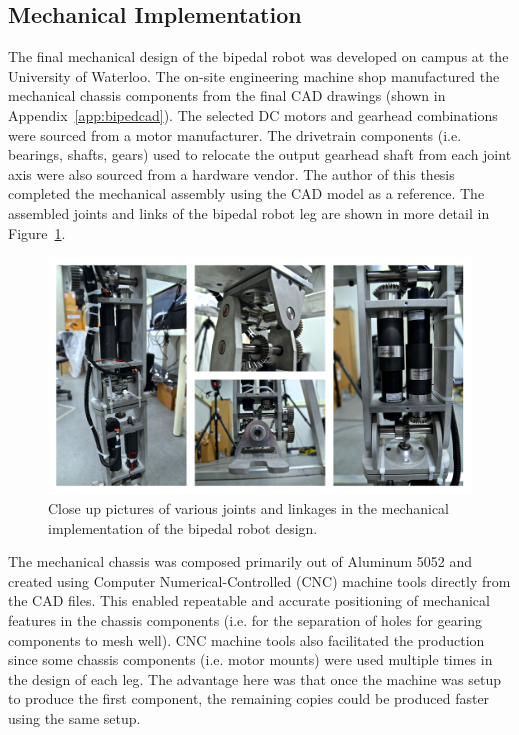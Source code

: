 \subsection{Mechanical Implementation} %
\label{sub:mechanical_implementation}

The final mechanical design of the bipedal robot was developed on campus at the University of Waterloo. The on-site engineering machine shop manufactured the mechanical chassis components from the final CAD drawings (shown in Appendix~\ref{app:bipedcad}). The selected DC motors and gearhead combinations were sourced from a motor manufacturer. The drivetrain components (i.e. bearings, shafts, gears) used to relocate the output gearhead shaft from each joint axis were also sourced from a hardware vendor. The author of this thesis completed the mechanical assembly using the CAD model as a reference. The assembled joints and links of the bipedal robot leg are shown in more detail in Figure~\ref{fig:bipedcloseup}.

\begin{figure}[!h]
	\centering
    \includegraphics[scale=0.38]{fig/hardware/bipedcloseup.png} 
  	\caption{Close up pictures of various joints and linkages in the mechanical implementation of the bipedal robot design.}
	\label{fig:bipedcloseup}
\end{figure}

The mechanical chassis was composed primarily out of Aluminum 5052 and created using Computer Numerical-Controlled (CNC) machine tools directly from the CAD files. This enabled repeatable and accurate positioning of mechanical features in the chassis components (i.e. for the separation of holes for gearing components to mesh well). CNC machine tools also facilitated the production since some chassis components (i.e. motor mounts) were used multiple times in the design of each leg. The advantage here was that once the machine was setup to produce the first component, the remaining copies could be produced faster using the same setup. 


